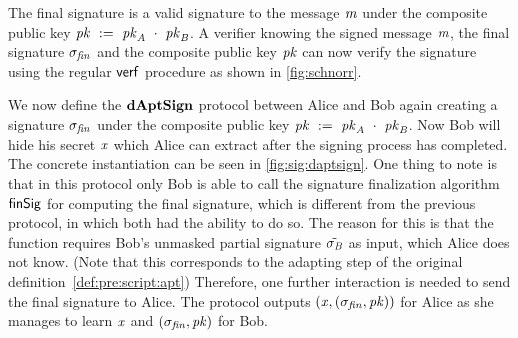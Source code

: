 The final signature is a valid signature to the message $\mathit{m}$ under the composite public key $\mathit{pk} ~:=~ \mathit{pk}_{\mathit{A}} ~\cdot~ \mathit{pk}_{\mathit{B}}$.
A verifier knowing the signed message $\mathit{m}$, the final signature $\sigma_{\mathit{fin}}$ and the composite public key $\mathit{pk}$ can now verify the signature using the regular $\mathsf{verf}$ procedure as shown in \cref{fig:schnorr}.

We now define the $\mathbf{dAptSign}$ protocol between Alice and Bob again creating a signature $\sigma_{\mathit{fin}}$ under the composite public key $\mathit{pk} ~:=~ \mathit{pk}_{\mathit{A}} ~\cdot~ \mathit{pk}_{\mathit{B}}$.
Now Bob will hide his secret $\mathit{x}$ which Alice can extract after the signing process has completed.
The concrete instantiation can be seen in \cref{fig:sig:daptsign}.
One thing to note is that in this protocol only Bob is able to call the signature finalization algorithm $\mathsf{finSig}$ for computing the final signature, which is different from the previous protocol, in which both had the ability to do so.
The reason for this is that the function requires Bob's unmasked partial signature $\tilde{\sigma_{\mathit{B}}}$ as input, which Alice does not know. (Note that this corresponds to the adapting step of the original definition~\cref{def:pre:script:apt})
Therefore, one further interaction is needed to send the final signature to Alice.
The protocol outputs $(\mathit{x}, (\sigma_{\mathit{fin}}, \mathit{pk}))$ for Alice as she manages to learn $\mathit{x}$ and $(\sigma_{\mathit{fin}}, \mathit{pk})$ for Bob.

